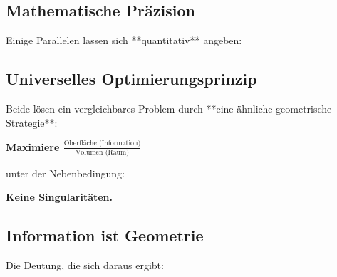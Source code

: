	\subsection{Mathematische Präzision}

	Einige Parallelen lassen sich **quantitativ** angeben:

	\begin{table}[h]
		\centering
		\small
		\caption{Quantitative Parallelen}
	\end{table}

	\subsection{Universelles Optimierungsprinzip}

	Beide lösen ein vergleichbares Problem durch **eine ähnliche geometrische Strategie**:

	\begin{center}

		\textbf{Maximiere $\frac{\text{Oberfläche (Information)}}{\text{Volumen (Raum)}}$}

		\normalsize
		unter der Nebenbedingung:


		\textbf{Keine Singularitäten.}
	\end{center}

	\subsection{Information ist Geometrie}

	Die Deutung, die sich daraus ergibt:

